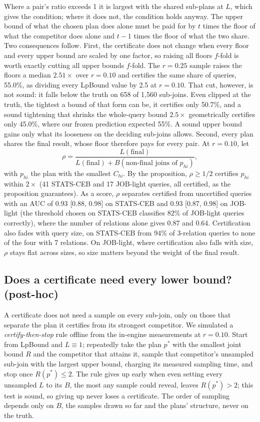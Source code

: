 \documentclass[sigconf, nonacm]{acmart}
\begin{document}
\noindent Where a pair's ratio exceeds 1 it is largest with the shared
sub-plans at $L$, which gives the condition; where it does not, the condition
holds anyway. The upper bound of what the chosen plan does alone must be paid
for by $t$ times the floor of what the competitor does alone and $t-1$ times the
floor of what the two share. Two consequences follow. First, the certificate
does not change when every floor and every upper bound are scaled by one
factor, so raising all floors $f$-fold is worth exactly cutting all upper bounds
$f$-fold. The $r{=}0.25$ sample raises the floors a median $2.51\times$ over
$r{=}0.10$ and certifies the same share of queries, 55.0\%, as dividing every
LpBound value by 2.5 at $r{=}0.10$. That cut, however, is not sound: it falls
below the truth on 658 of 1{,}560 sub-joins. Even clipped at the truth, the
tightest a bound of that form can be, it certifies only 50.7\%,
and a sound tightening that shrinks the whole-query bound $2.5\times$
geometrically certifies only 45.0\%, where our frozen prediction expected 55\%.
A sound upper bound gains only what its looseness on the deciding sub-joins
allows. Second, every plan shares the final result, whose floor therefore pays
for every pair. At $r{=}0.10$, let
\begin{equation*}
\rho = \frac{L(\text{final})}{L(\text{final}) + B(\text{non-final joins of } p_{hi})},
\end{equation*}
with $p_{hi}$ the plan with the smallest $C_{hi}$. By the
proposition, $\rho\ge1/2$ certifies $p_{hi}$ within $2\times$ (41 STATS-CEB and
17 JOB-light queries, all certified, as the proposition guarantees). As a score, $\rho$ separates certified
from uncertified queries with an AUC of 0.93 [0.88, 0.98] on STATS-CEB and 0.93
[0.87, 0.98] on JOB-light (the threshold chosen on STATS-CEB classifies 82\% of
JOB-light queries correctly), where the number of relations alone gives 0.87
and 0.64. Certification also fades with query size, on STATS-CEB from 94\% of
3-relation queries to none of the four with 7 relations. On JOB-light, where
certification also falls with size, $\rho$ stays flat across sizes, so size
matters beyond the weight of the final result.

\subsection{Does a certificate need every lower bound? (post-hoc)}
A certificate does not need a sample on every sub-join, only on those that
separate the plan it certifies from its strongest competitor. We simulated a
\emph{certify-then-stop} rule offline from the in-engine measurements at
$r{=}0.10$. Start from LpBound and $L\equiv1$; repeatedly take the plan $p^*$
with the smallest joint bound $R$ and the competitor that attains it, sample
that competitor's unsampled sub-join with the largest upper bound, charging its
measured sampling time, and stop once $R(p^*)\le2$. The rule gives up early
when even setting every unsampled $L$ to its $B$, the most any sample could
reveal, leaves $R(p^*)>2$; this test is sound, so giving up never loses a
certificate. The order of sampling depends only on $B$, the samples drawn so far
and the plans' structure, never on the truth.
\end{document}
